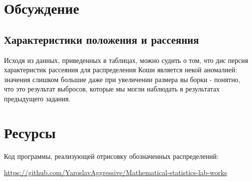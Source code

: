 \documentclass[a4paper]{article}
\begin{document}
    
    
\section{Обсуждение}
    \subsection{Характеристики положения и рассеяния}
        Исходя из данных, приведенных в таблицах, можно судить о том, что дисперсия характеристик рассеяния для распределения Коши является некой
аномалией: значения слишком большие даже при увеличении размера выборки - понятно, что это результат выбросов, которые мы могли наблюдать
в результатах предыдущего задания.

\section{Ресурсы}
    \begin{spacing}{2.5}
        Код программы, реализующей отрисовку обозначенных распределений:
        
        \href{https://github.com/YaroslavAggressive/Mathematical-statistics-lab-works}{https://github.com/YaroslavAggressive/Mathematical-statistics-lab-works}
    \end{spacing}
\end{document}
